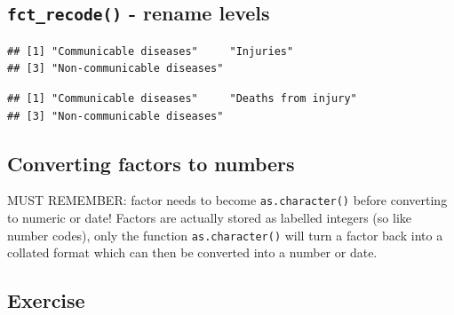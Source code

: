 \documentclass[12pt,]{krantz}
\makeatletter
\newenvironment{Shaded}{\begin{snugshade}}{\end{snugshade}}
\newcommand{\CommentTok}[1]{\textcolor[rgb]{0.56,0.35,0.01}{\textit{#1}}}
\newcommand{\KeywordTok}[1]{\textcolor[rgb]{0.13,0.29,0.53}{\textbf{#1}}}
\newcommand{\NormalTok}[1]{#1}
\newcommand{\OperatorTok}[1]{\textcolor[rgb]{0.81,0.36,0.00}{\textbf{#1}}}
\newcommand{\StringTok}[1]{\textcolor[rgb]{0.31,0.60,0.02}{#1}}
\newenvironment{kframe}{%
\medskip{}
\setlength{\fboxsep}{.8em}
 \def\at@end@of@kframe{}%
 \ifinner\ifhmode%
  \def\at@end@of@kframe{\end{minipage}}%
  \begin{minipage}{\columnwidth}%
 \fi\fi%
 \def\FrameCommand##1{\hskip\@totalleftmargin \hskip-\fboxsep
 \colorbox{shadecolor}{##1}\hskip-\fboxsep
     \hskip-\linewidth \hskip-\@totalleftmargin \hskip\columnwidth}%
 \MakeFramed {\advance\hsize-\width
   \@totalleftmargin\z@ \linewidth\hsize
   \@setminipage}}%
 {\par\unskip\endMakeFramed%
 \at@end@of@kframe}
\renewenvironment{Shaded}{\begin{kframe}}{\end{kframe}}
\theoremstyle{definition}
\theoremstyle{definition}
\theoremstyle{definition}
\theoremstyle{remark}
\makeatother
\begin{document}
\hypertarget{fct_recode---rename-levels}{%
\subsection{\texorpdfstring{\texttt{fct\_recode()} - rename
levels}{fct\_recode() - rename levels}}\label{fct_recode---rename-levels}}

\begin{Shaded}
\end{Shaded}

\begin{verbatim}
## [1] "Communicable diseases"     "Injuries"                 
## [3] "Non-communicable diseases"
\end{verbatim}

\begin{Shaded}
\end{Shaded}

\begin{verbatim}
## [1] "Communicable diseases"     "Deaths from injury"       
## [3] "Non-communicable diseases"
\end{verbatim}

\hypertarget{converting-factors-to-numbers}{%
\subsection{Converting factors to
numbers}\label{converting-factors-to-numbers}}

MUST REMEMBER: factor needs to become \texttt{as.character()} before
converting to numeric or date! Factors are actually stored as labelled
integers (so like number codes), only the function
\texttt{as.character()} will turn a factor back into a collated format
which can then be converted into a number or date.

\hypertarget{exercise-17}{%
\subsection{Exercise}\label{exercise-17}}
\end{document}
